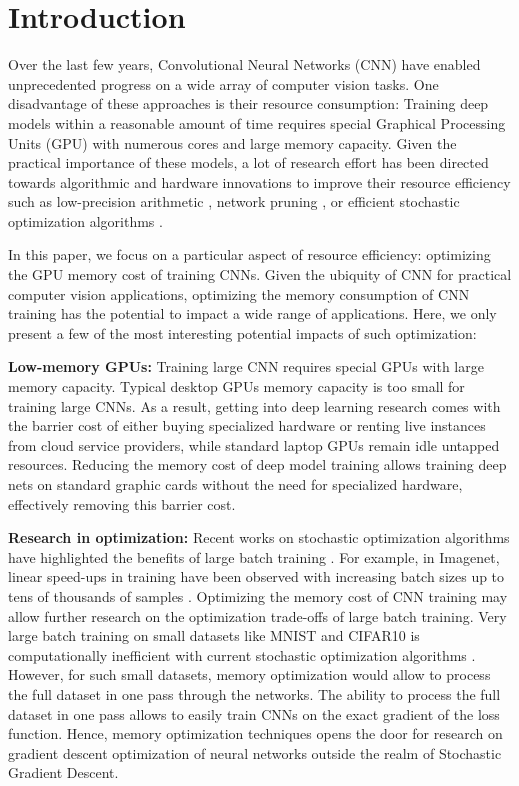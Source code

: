 \documentclass[11pt,onecolumn]{article}
\begin{document}
\section{Introduction}
Over the last few years, Convolutional Neural Networks (CNN) 
have enabled unprecedented progress on a wide array of computer vision tasks.
One disadvantage of these approaches is their resource consumption: 
Training deep models within a reasonable amount of time requires special
Graphical Processing Units (GPU) with numerous cores and large memory capacity.
Given the practical importance of these models, a lot of research effort has been directed
towards algorithmic and hardware innovations to improve their resource efficiency such as low-precision arithmetic \cite{jacob2018quantization}, network pruning \cite{molchanov2016pruning}, or efficient stochastic optimization algorithms \cite{kingma2014adam}.

In this paper, we focus on a particular aspect of resource efficiency: 
optimizing the GPU memory cost of training CNNs. 
Given the ubiquity of CNN for practical computer vision applications,
optimizing the memory consumption of CNN training has the potential to
impact a wide range of applications. 
Here, we only present a few of the most interesting 
potential impacts of such optimization:

\textbf{Low-memory GPUs:} 
Training large CNN requires special GPUs with large memory capacity. 
Typical desktop GPUs memory capacity is too small for training large CNNs.
As a result, getting into deep learning research comes 
with the barrier cost of either buying specialized hardware 
or renting live instances from cloud service providers,
while standard laptop GPUs remain idle untapped resources.
Reducing the memory cost of deep model training allows 
training deep nets on standard graphic cards without 
the need for specialized hardware, effectively removing this barrier cost.

\textbf{Research in optimization:}
Recent works on stochastic optimization algorithms have highlighted the benefits of large batch training \cite{shallue2018measuring,mccandlish2018empirical,you2017large}.
For example, in Imagenet, linear speed-ups in training have been observed 
with increasing batch sizes up to tens of thousands of samples \cite{mccandlish2018empirical}.
Optimizing the memory cost of CNN training may allow further research 
on the optimization trade-offs of large batch training.
Very large batch training on small datasets like MNIST and CIFAR10 is 
computationally inefficient with current stochastic optimization algorithms \cite{mccandlish2018empirical}.
However, for such small datasets, memory optimization would allow to process the full dataset 
in one pass through the networks. 
The ability to process the full dataset in one pass allows to easily train CNNs on the exact gradient of the loss function.
Hence, memory optimization techniques opens the door for research on gradient descent 
optimization of neural networks outside the realm of Stochastic Gradient Descent.
\end{document}
